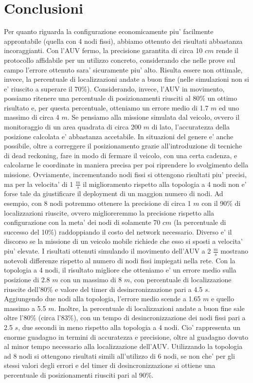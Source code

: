 \section{Conclusioni}
Per quanto riguarda la configurazione economicamente piu' facilmente approntabile (quella con 4 nodi fissi), abbiamo ottenuto dei risultati abbastanza incoraggianti. Con l'AUV fermo, la precisione garantita di circa 10 $cm$ rende il protocollo  affidabile per un utilizzo concreto, considerando che nelle prove sul campo l'errore ottenuto sara' sicuramente piu' alto.
Risulta essere non ottimale, invece, la percentuale di localizzazioni andate a buon fine (nelle simulazioni non si e' riuscito a superare il  70\%). Considerando, invece, l'AUV in movimento, possiamo ritenere una percentuale di posizionamenti riusciti al 80\% un ottimo risultato e, per questa percentuale, otteniamo un errore medio di 1.7 $m$ ed uno massimo di circa 4 $m$. Se pensiamo alla missione simulata dal veicolo, ovvero il monitoraggio di un area quadrata di circa 200 $m$ di lato, l'accuratezza della posizione calcolata e' abbastanza accetabile. In situazioni del genere e' anche possibile, oltre a correggere il posizionamento grazie all'introduzione di tecniche di dead reckoning, fare in modo di fermare il veicolo, con una certa cadenza, e calcolarne le coordinate in maniera precisa per poi riprendere lo svolgimento della missione.
Ovviamente, incrementando nodi fissi si ottengono risultati piu' precisi, ma per la velocita' di 1 $\frac{m}{s}$ il miglioramento rispetto alla topologia a 4 nodi non e' forse tale da giustificare il deployment di un maggion numero di nodi.
Ad esempio, con 8 nodi potremmo ottenere la precisione di circa 1 $m$ con il 90\% di localizzazioni riuscite, ovvero miglioreremmo la precisione rispetto alla configurazione con la meta' dei nodi di solamente 70 $cm$ (la percentuale di successo del 10\%) raddoppiando il costo del network necessario.
Diverso e' il discorso se la missione di un veicolo mobile richiede che esso si sposti a velocita' piu' elevate. I risultati ottenuti simulando il movimento dell'AUV a 2 $\frac{m}{s}$ mostrano notevoli differenze rispetto al numero di nodi fissi impiegati nella rete.
Con la topologia a 4 nodi, il risultato migliore che otteniamo e' un errore medio sulla posizione di 2.8 $m$ con un massimo di 8 $m$, con percentuale di localizzazione riuscite dell'80\% e valore del timer di desincronizzazione pari a 4.5 $s$.
Aggiungendo due nodi alla topologia, l'errore medio scende a 1.65 $m$ e quello massimo a 5.5 $m$. Inoltre, la percentuale di localizzazioni andate a buon fine sale oltre l'80\% (circa l'83\%), con un tempo di desincronizzazione dei nodi fissi pari a 2.5 $s$, due secondi in meno rispetto alla topologia a 4 nodi. Cio' rappresenta un enorme guadagno in termini di accuratezza e precisione, oltre al guadagno dovuto al minor tempo necessario alla localizzazione dell'AUV.
Utilizzando la topologia ad 8 nodi si ottengono risultati simili all'utilizzo di 6 nodi, se non che' per gli stessi valori degli errori e del timer di desincronizzazione si ottiene una percentuale di posizionamenti riusciti pari al 90\%.









